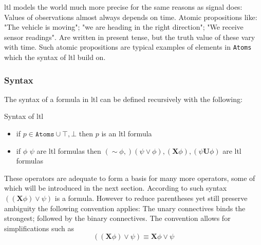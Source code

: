 \acrshort{ltl} models the world much more precise for the same reasons as signal does: Values of observations almost always depends on time. Atomic propositions like: "The vehicle is moving"; "we are heading in the right direction"; "We receive sensor readings". Are written in present tense, but the truth value of these vary with time. Such atomic propositions are typical examples of elements in \verb|Atoms| which the syntax of \acrshort{ltl} build on.

\subsubsection{Syntax}
The syntax of a formula in \acrshort{ltl} can be defined recursively with the following:
\begin{definition}
Syntax of \acrshort{ltl}
\label{def:formula}
\begin{itemize}
    \item if $ p \in \texttt{Atoms} \cup {\top, \bot} $ then $p$ is an \acrshort{ltl} formula
    \item if $\phi$ $\psi$ are \acrshort{ltl} formulas then $(\sim \phi,) (\psi \vee \phi), (\mathbf{X} \phi), (\psi \mathbf{U} \phi)$ are \acrshort{ltl} formulas
\end{itemize}
\end{definition}
These operators are adequate to form a basis for many more operators, some of which will be introduced in the next section.
According to such syntax $((\mathbf{X}\phi) \vee \psi)$ is a formula. However to reduce parentheses yet still preserve ambiguity the following convention applies: The unary connectives binds the strongest; followed by the binary connectives. The convention allows for simplifications such as
$$((\mathbf{X}\phi) \vee \psi) \equiv \mathbf{X}\phi \vee \psi$$

